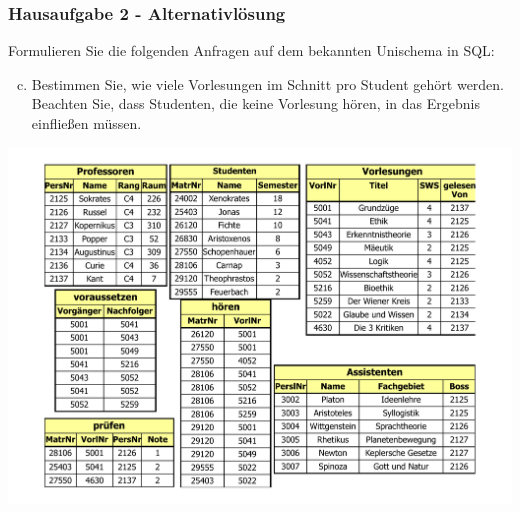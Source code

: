 \begin{frame}[fragile]
	\frametitle{Hausaufgabe 2 - Alternativlösung}
	\vspace{0.5cm}

	\begin{multicols}{2}
		Formulieren Sie die folgenden Anfragen auf dem bekannten Unischema in SQL:
		\begin{enumerate}[a)]
			\setcounter{enumi}{2}
			\item Bestimmen Sie, wie viele Vorlesungen im Schnitt pro Student gehört werden. 
				  Beachten Sie, dass Studenten, die keine Vorlesung hören, in das Ergebnis einfließen müssen.
		\end{enumerate}
		\vfill\columnbreak

		\begin{center}
			\includegraphics[height=.6\paperheight]{../img/uni.pdf}
		\end{center}
	\end{multicols}
\end{frame}

